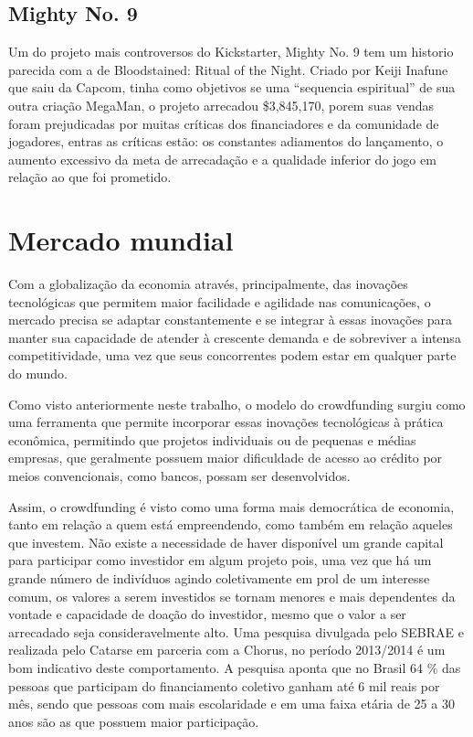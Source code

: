 \documentclass{classe_cn}                 %
\begin{document}
\subsection{Mighty No. 9}

Um do projeto mais controversos do Kickstarter, Mighty No. 9 tem um historio parecida com a de Bloodstained: Ritual of the Night. Criado por Keiji Inafune que saiu da Capcom, tinha como objetivos se uma “sequencia espiritual” de sua outra criação MegaMan, o projeto arrecadou \$3,845,170, porem suas vendas foram prejudicadas por muitas críticas dos financiadores e da comunidade de jogadores, entras as críticas estão: os constantes adiamentos do lançamento, o aumento excessivo da meta de arrecadação e a qualidade inferior do jogo em relação ao que foi prometido.

\section{Mercado mundial}

Com a globalização da economia através, principalmente, das inovações tecnológicas que permitem maior facilidade e agilidade nas comunicações, o mercado precisa se adaptar constantemente e se integrar à essas inovações para manter sua capacidade de atender à crescente demanda e de sobreviver a intensa competitividade, uma vez que seus concorrentes podem estar em qualquer parte do mundo.

Como visto anteriormente neste trabalho, o modelo do crowdfunding surgiu como uma ferramenta que permite incorporar essas inovações tecnológicas à prática econômica, permitindo que projetos individuais ou de pequenas e médias empresas, que geralmente possuem maior dificuldade de acesso ao crédito por meios convencionais, como bancos, possam ser desenvolvidos.

Assim, o crowdfunding é visto como uma forma mais democrática de economia, tanto em relação a quem está empreendendo, como também em relação aqueles que investem. Não existe a necessidade de haver disponível um grande capital para participar como investidor em algum projeto pois, uma vez que há um grande número de indivíduos agindo coletivamente em prol de um interesse comum, os valores a serem investidos se tornam menores e mais dependentes da vontade e capacidade de doação do investidor, mesmo que o valor a ser arrecadado seja consideravelmente alto. Uma pesquisa divulgada pelo SEBRAE \cite{SEBRAE:2017} e realizada pelo Catarse em parceria com a Chorus, no período 2013/2014 é um bom indicativo deste comportamento. A pesquisa aponta que no Brasil 64 \% das pessoas que participam do financiamento coletivo ganham até 6 mil reais por mês, sendo que pessoas com mais escolaridade e em uma faixa etária de 25 a 30 anos são as que possuem maior participação.
\end{document}
